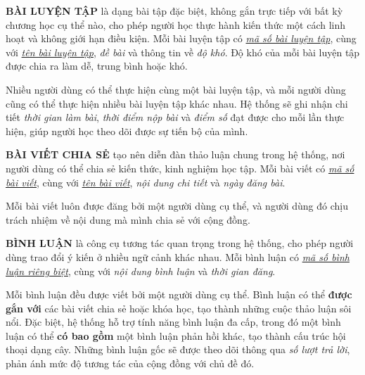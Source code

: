 \textbf{BÀI LUYỆN TẬP} là dạng bài tập đặc biệt, không gắn trực tiếp với bất kỳ chương học cụ thể nào, cho phép người học thực hành kiến thức một cách linh hoạt và không giới hạn điều kiện. Mỗi bài luyện tập có \underline{\textit{mã số bài luyện tập}}, cùng với \underline{\textit{tên bài luyện tập}}, \textit{đề bài} và thông tin về \textit{độ khó}. Độ khó của mỗi bài luyện tập được chia ra làm dễ, trung bình hoặc khó.

Nhiều người dùng có thể thực hiện cùng một bài luyện tập, và mỗi người dùng cũng có thể thực hiện nhiều bài luyện tập khác nhau. Hệ thống sẽ ghi nhận chi tiết \textit{thời gian làm bài}, \textit{thời điểm nộp bài} và \textit{điểm số} đạt được cho mỗi lần thực hiện, giúp người học theo dõi được sự tiến bộ của mình.

\textbf{BÀI VIẾT CHIA SẺ} tạo nên diễn đàn thảo luận chung trong hệ thống, nơi người dùng có thể chia sẻ kiến thức, kinh nghiệm học tập. Mỗi bài viết có \underline{\textit{mã số bài viết}}, cùng với \underline{\textit{tên bài viết}}, \textit{nội dung chi tiết} và \textit{ngày đăng bài}.

Mỗi bài viết luôn được đăng bởi một người dùng cụ thể, và người dùng đó chịu trách nhiệm về nội dung mà mình chia sẻ với cộng đồng.

\textbf{BÌNH LUẬN} là công cụ tương tác quan trọng trong hệ thống, cho phép người dùng trao đổi ý kiến ở nhiều ngữ cảnh khác nhau. Mỗi bình luận có \underline{\textit{mã số bình luận riêng biệt}}, cùng với \textit{nội dung bình luận} và \textit{thời gian đăng}.

Mỗi bình luận đều được viết bởi một người dùng cụ thể. Bình luận có thể \textbf{được gắn với} các bài viết chia sẻ hoặc khóa học, tạo thành những cuộc thảo luận sôi nổi. Đặc biệt, hệ thống hỗ trợ tính năng bình luận đa cấp, trong đó một bình luận có thể \textbf{có bao gồm} một bình luận phản hồi khác, tạo thành cấu trúc hội thoại dạng cây. Những bình luận gốc sẽ được theo dõi thông qua \textit{số lượt trả lời}, phản ánh mức độ tương tác của cộng đồng với chủ đề đó.


